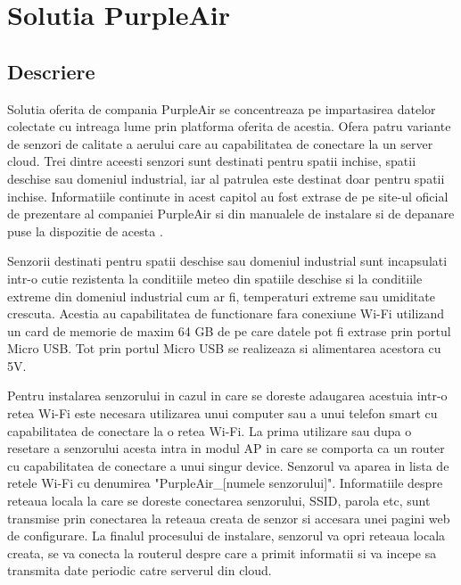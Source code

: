 \section{Solutia PurpleAir}\label{sec:sb_purpleair}
\subsection{Descriere}\label{subsec:sb_purpleair_descriere}
Solutia oferita de compania PurpleAir se concentreaza pe impartasirea datelor colectate cu intreaga lume prin platforma oferita de acestia. Ofera patru variante 
de senzori de calitate a aerului care au capabilitatea de conectare la un server cloud. Trei dintre aceesti senzori sunt destinati pentru spatii inchise, spatii 
deschise sau domeniul industrial, iar al patrulea este destinat doar pentru spatii inchise. Informatiile continute in acest capitol au fost extrase de pe site-ul oficial de 
prezentare al companiei PurpleAir si din manualele de instalare si de depanare puse la dispozitie de acesta \cite{purpleair}.

Senzorii destinati pentru spatii deschise sau domeniul industrial sunt incapsulati intr-o cutie rezistenta la conditiile meteo din spatiile deschise si la 
conditiile extreme din domeniul industrial cum ar fi, temperaturi extreme sau umiditate crescuta. Acestia au capabilitatea de functionare fara conexiune Wi-Fi 
utilizand un card de memorie de maxim 64 GB de pe care datele pot fi extrase prin portul Micro USB. Tot prin portul Micro USB se realizeaza si alimentarea 
acestora cu 5V.

Pentru instalarea senzorului in cazul in care se doreste adaugarea acestuia intr-o retea Wi-Fi este necesara utilizarea unui computer sau a unui telefon smart 
cu capabilitatea de conectare la o retea Wi-Fi. La prima utilizare sau dupa o resetare a senzorului acesta intra in modul AP in care se comporta ca un router cu 
capabilitatea de conectare a unui singur device. Senzorul va aparea in lista de retele Wi-Fi cu denumirea "PurpleAir\_[numele senzorului]". Informatiile despre 
reteaua locala la care se doreste conectarea senzorului, SSID, parola etc, sunt transmise prin conectarea la reteaua creata de senzor si accesara unei pagini 
web de configurare. La finalul procesului de instalare, senzorul va opri reteaua locala creata, se va conecta la routerul despre care a primit informatii 
si va incepe sa transmita date periodic catre serverul din cloud.

